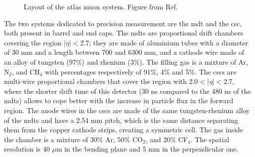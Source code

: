 \begin{figure}[ht]
\centering
{}
\caption{Layout of the \gls{atlas} muon system. Figure from Ref. \cite{atlas:atlas}}
\label{fig:atlas:muon}
\end{figure}

The two systems dedicated to precision measurement are the \gls{mdt} and the \gls{csc}, both present in barrel and end caps. The \glspl{mdt} are proportional drift chambers covering the region $|\eta|<$2.7; they are made of aluminium tubes with a diameter of 30 mm and a length between 700 and 6300 mm, and a cathode wire made of an alloy of tungsten (97\%) and rhenium (3\%). The filling gas is a mixture of Ar, N$_2$, and CH$_4$ with percentages respectively of 91\%, 4\% and 5\%. The \glspl{csc} are multi-wire proportional chambers that cover the region with 2.0$<|\eta|<$2.7, where the shorter drift time of this detector (30 ns compared to the 480 ns of the \glspl{mdt}) allows to cope better with the increase in particle flux in the forward region. The anode wires in the \glspl{csc} are made of the same tungsten-rhenium alloy of the \glspl{mdt} and have a 2.54 mm pitch, which is the same distance separating them from the copper cathode strips, creating a symmetric cell. The gas inside the chamber is a mixture of 30\% Ar, 50\% CO$_2$, and 20\% CF$_4$. The spatial resolution is 40 $\mu$m in the bending plane and 5 mm in the perpendicular one.

